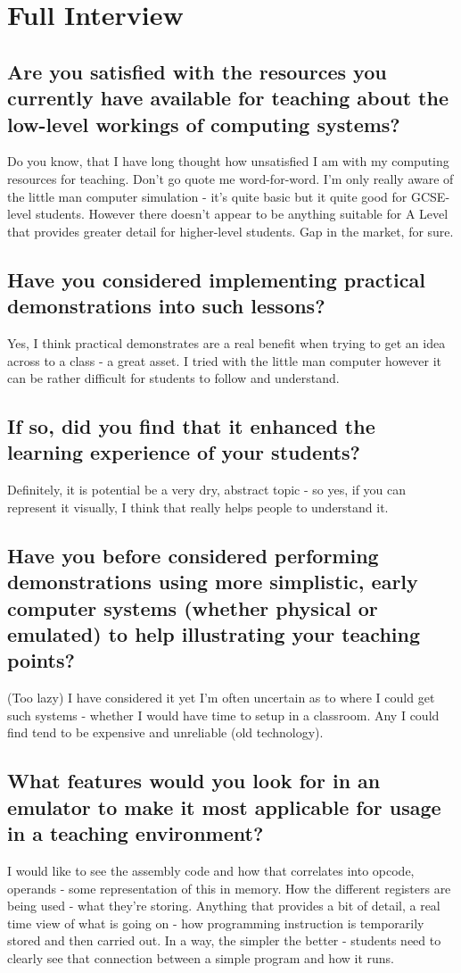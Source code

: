 \section{Full Interview} \label{sec:full-interview}
    \subsection{Are you satisfied with the resources you currently have available for teaching about the low-level workings of computing systems?}
        Do you know, that I have long thought how unsatisfied I am with my computing resources for teaching. Don't go quote me word-for-word. I'm only really aware of the little man computer simulation - it's quite basic but it quite good for GCSE-level students. However there doesn't appear to be anything suitable for A Level that provides greater detail for higher-level students. Gap in the market, for sure.
    
    \subsection{Have you considered implementing practical demonstrations into such lessons?}
        Yes, I think practical demonstrates are a real benefit when trying to get an idea across to a class - a great asset. I tried with the little man computer however it can be rather difficult for students to follow and understand.

    \subsection{If so, did you find that it enhanced the learning experience of your students?}
        Definitely, it is potential be a very dry, abstract topic - so yes, if you can represent it visually, I think that really helps people to understand it.
    
    \subsection{Have you before considered performing demonstrations using more simplistic, early computer systems (whether physical or emulated) to help illustrating your teaching points?}
        (Too lazy) I have considered it yet I'm often uncertain as to where I could get such systems - whether I would have time to setup in a classroom. Any I could find tend to be expensive and unreliable (old technology).
    
    \subsection{What features would you look for in an emulator to make it most applicable for usage in a teaching environment?}
        I would like to see the assembly code and how that correlates into opcode, operands - some representation of this in memory. How the different registers are being used - what they're storing. Anything that provides a bit of detail, a real time view of what is going on - how programming instruction is temporarily stored and then carried out. In a way, the simpler the better - students need to clearly see that connection between a simple program and how it runs.
    
